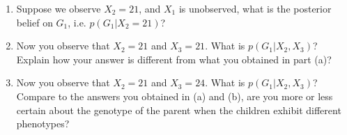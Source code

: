 \documentclass[11pt]{article}
\begin{document}
\begin{enumerate}[{(a)}]
\item Suppose we observe $X_2 = 21$, and $X_1$ is unobserved, what is the posterior belief on $G_1$, i.e. $p(G_1| X_2 = 21)$? \newline
\begin{answertext}{5cm}{}
    
\end{answertext}
\item Now you observe that $X_2 = 21$ and $X_3 = 21$. What is $p(G_1|X_2, X_3)$? Explain how your answer is different from what you obtained in part (a)?
\newline
\begin{answertext}{7cm}{}
    
\end{answertext}
\item Now you observe that $X_2 = 21$ and $X_3 = 24$. What is $p(G_1|X_2, X_3)$? Compare to the answers you obtained in (a) and (b), are you more or less certain about the genotype of the parent when the children exhibit different phenotypes?
\newline
\begin{answertext}{6cm}{}
    
\end{answertext}
\end{enumerate}
\end{document}

